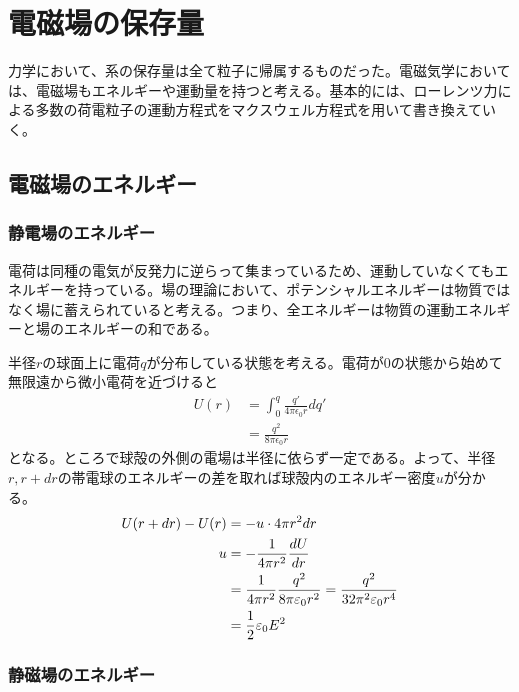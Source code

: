 \section{電磁場の保存量}

力学において、系の保存量は全て粒子に帰属するものだった。電磁気学においては、電磁場もエネルギーや運動量を持つと考える。基本的には、ローレンツ力による多数の荷電粒子の運動方程式をマクスウェル方程式を用いて書き換えていく。

\subsection{電磁場のエネルギー}
    \subsubsection{静電場のエネルギー}
        電荷は同種の電気が反発力に逆らって集まっているため、運動していなくてもエネルギーを持っている。場の理論において、ポテンシャルエネルギーは物質ではなく場に蓄えられていると考える。つまり、全エネルギーは物質の運動エネルギーと場のエネルギーの和である。

        半径$r$の球面上に電荷$q$が分布している状態を考える。電荷が0の状態から始めて無限遠から微小電荷を近づけると
        \begin{align*}
            U(r)
                &= \int_0^q \frac{q'}{4\pi\epsilon_0 r} dq'\\
                &= \frac{q^2}{8\pi\epsilon_0 r}
        \end{align*}
        となる。ところで球殻の外側の電場は半径に依らず一定である。よって、半径$r, r + dr$の帯電球のエネルギーの差を取れば球殻内のエネルギー密度$u$が分かる。
        \begin{align*}
            U(r + dr) - U(r) &= -u \cdot 4\pi r^2dr\\
            u &= -\frac{1}{4\pi r^2}\de[U]{r}\\
            &= \frac{1}{4\pi r^2}\frac{q^2}{8\pi\epsilon_0 r^2} = \frac{q^2}{32\pi^2\epsilon_0 r^4}\\
            &= \frac{1}{2}\epsilon_0 E^2
        \end{align*}

    \subsubsection{静磁場のエネルギー}
